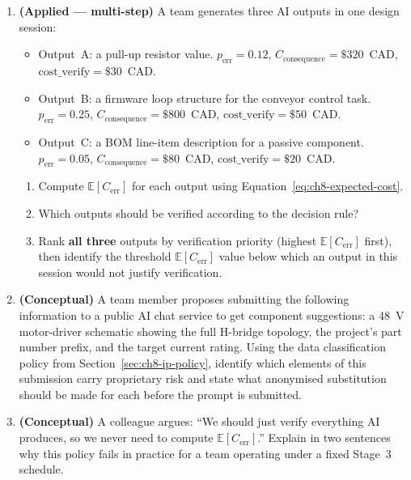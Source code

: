 \begin{enumerate}
  \item \textbf{(Applied --- multi-step)} A team generates three AI outputs
  in one design session:
  \begin{itemize}
    \item Output~A: a pull-up resistor value.
          $p_{\text{err}} = 0.12$, $C_{\text{consequence}} = \$320$~CAD,
          $\text{cost\_verify} = \$30$~CAD.
    \item Output~B: a firmware loop structure for the conveyor control task.
          $p_{\text{err}} = 0.25$, $C_{\text{consequence}} = \$800$~CAD,
          $\text{cost\_verify} = \$50$~CAD.
    \item Output~C: a BOM line-item description for a passive component.
          $p_{\text{err}} = 0.05$, $C_{\text{consequence}} = \$80$~CAD,
          $\text{cost\_verify} = \$20$~CAD.
  \end{itemize}
  \begin{enumerate}
    \item[(a)] Compute $\mathbb{E}[C_{\text{err}}]$ for each output using
               Equation~\ref{eq:ch8-expected-cost}.
    \item[(b)] Which outputs should be verified according to the decision rule?
    \item[(c)] Rank \textbf{all three} outputs by verification priority
               (highest $\mathbb{E}[C_{\text{err}}]$ first), then identify
               the threshold $\mathbb{E}[C_{\text{err}}]$ value below which
               an output in this session would not justify verification.
  \end{enumerate}

  \item \textbf{(Conceptual)} A team member proposes submitting the following
  information to a public AI chat service to get component suggestions:
  a 48~V motor-driver schematic showing the full H-bridge topology, the
  project's part number prefix, and the target current rating.
  Using the data classification policy from Section~\ref{sec:ch8-ip-policy},
  identify which elements of this submission carry proprietary risk and state
  what anonymised substitution should be made for each before the prompt is
  submitted.

  \item \textbf{(Conceptual)} A colleague argues: ``We should just verify
  everything AI produces, so we never need to compute
  $\mathbb{E}[C_{\text{err}}]$.''
  Explain in two sentences why this policy fails in practice for a team
  operating under a fixed Stage~3 schedule.

\end{enumerate}

